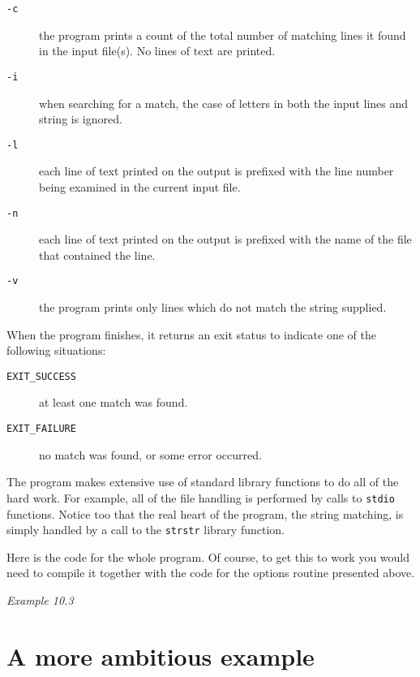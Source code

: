   \begin{description}
   \item[\texttt{-c}] the program prints a count of the total number of matching lines it
    found in the input file(s). No lines of text are printed.

   \item[\texttt{-i}] when searching for a match, the case of letters in both the input lines
    and string is ignored.

   \item[\texttt{-l}] each line of text printed on the output is prefixed with the line number
    being examined in the current input file.

   \item[\texttt{-n}] each line of text printed on the output is prefixed with the name of the
    file that contained the line.

   \item[\texttt{-v}] the program prints only lines which do not match the string
    supplied.
  \end{description}

  When the program finishes, it returns an exit status to indicate one of
   the following situations:


  \begin{description}
   \item[\texttt{EXIT\_SUCCESS}] at least one match was found.
   \item[\texttt{EXIT\_FAILURE}] no match was found, or some error occurred.
  \end{description}

  The program makes extensive use of standard library functions to do all of
   the hard work. For example, all of the file handling is performed by calls
   to \texttt{stdio} functions. Notice too that the real heart of the
   program, the string matching, is simply handled by a call to the
   \texttt{strstr} library function.


  Here is the code for the whole program. Of course, to get this to work you
   would need to compile it together with the code for the options routine
   presented above.


  \begin{center}\textit{Example 10.3}\end{center}


 
        \section{A more ambitious example}
        


